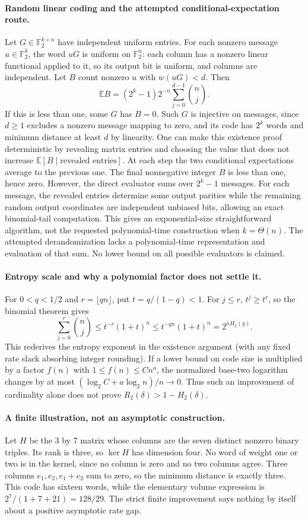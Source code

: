 \documentclass[11pt]{article}
\begin{document}
\paragraph{Random linear coding and the attempted conditional-expectation route.}
Let $G\in\mathbb F_2^{k\times n}$ have independent uniform entries. For each
nonzero message $u\in\mathbb F_2^k$, the word $uG$ is uniform on
$\mathbb F_2^n$: each column has a nonzero linear functional applied to it,
so its output bit is uniform, and columns are independent.
Let $B$ count nonzero $u$ with $w(uG)<d$. Then
\[
\mathbb EB=(2^k-1)2^{-n}\sum_{j=0}^{d-1}\binom nj.
\]
If this is less than one, some $G$ has $B=0$. Such $G$ is injective on
messages, since $d\ge1$ excludes a nonzero message mapping to zero, and
its code has $2^k$ words and minimum distance at least $d$ by linearity.
One can make this existence proof deterministic by revealing matrix entries
and choosing the value that does not increase $\mathbb E[B\mid\text{revealed entries}]$.
At each step the two conditional expectations average to the previous one.
The final nonnegative integer $B$ is less than one, hence zero.
However, the direct evaluator sums over $2^k-1$ messages. For each message,
the revealed entries determine some output parities while the remaining
random output coordinates are independent unbiased bits, allowing an exact
binomial-tail computation. This gives an exponential-size straightforward
algorithm, not the requested polynomial-time construction when $k=\Theta(n)$.
The attempted derandomization lacks a polynomial-time representation and
evaluation of that sum. No lower bound on all possible evaluators is claimed.

\paragraph{Entropy scale and why a polynomial factor does not settle it.}
For $0<q<1/2$ and $r=\lfloor qn\rfloor$, put $t=q/(1-q)<1$.
For $j\le r$, $t^j\ge t^r$, so the binomial theorem gives
\[
\sum_{j=0}^{r}\binom nj\le t^{-r}(1+t)^n
\le t^{-qn}(1+t)^n=2^{nH_2(q)}.
\]
This rederives the entropy exponent in the existence argument (with any
fixed rate slack absorbing integer rounding).
If a lower bound on code size is multiplied by a factor $f(n)$ with
$1\le f(n)\le Cn^a$, the normalized base-two logarithm changes by at most
$(\log_2 C+a\log_2 n)/n\to0$. Thus such an improvement of cardinality
alone does not prove $R_2(\delta)>1-H_2(\delta)$.

\paragraph{A finite illustration, not an asymptotic construction.}
Let $H$ be the $3$ by $7$ matrix whose columns are the seven distinct
nonzero binary triples. Its rank is three, so $\ker H$ has dimension four.
No word of weight one or two is in the kernel, since no column is zero and
no two columns agree. Three columns $e_1,e_2,e_1+e_2$ sum to zero, so the
minimum distance is exactly three. This code has sixteen words, while the
elementary volume expression is $2^7/(1+7+21)=128/29$. The strict finite
improvement says nothing by itself about a positive asymptotic rate gap.
\end{document}
